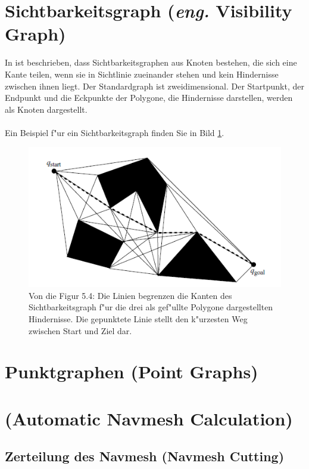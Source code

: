 \section{Sichtbarkeitsgraph (\textit{eng.} Visibility Graph)}
%
%
In \cite{Principles:05} ist beschrieben, dass Sichtbarkeitsgraphen aus Knoten bestehen, die sich eine Kante teilen, wenn sie in Sichtlinie zueinander stehen und kein Hindernisse zwischen ihnen liegt. Der Standardgraph ist zweidimensional. Der Startpunkt, der Endpunkt und die Eckpunkte der Polygone, die Hindernisse darstellen, werden als Knoten dargestellt.
\\\\
Ein Beispiel f"ur ein Sichtbarkeitsgraph finden Sie in Bild \ref{sec3a}.
\begin{figure} %
	\centering
	\includegraphics[width=\textwidth]{images/Robot_Motion_Visibility_Graph.png}
	\caption{Von \cite[~S. 111]{Principles:05} die Figur 5.4: Die Linien begrenzen die Kanten des Sichtbarkeitsgraph f"ur die drei als gef"ullte Polygone dargestellten Hindernisse. Die gepunktete Linie stellt den k"urzesten Weg zwischen Start und Ziel dar.}
	\label{sec3a}
\end{figure}


\section{Punktgraphen (Point Graphs)}


\section{(Automatic Navmesh Calculation)}


\subsection{Zerteilung des Navmesh (Navmesh Cutting)} 